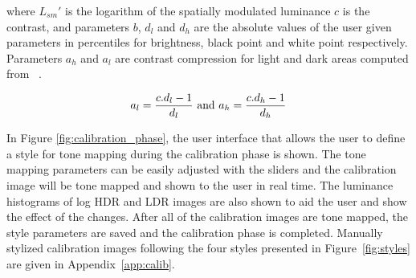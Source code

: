 where $L_{sm}'$ is the logarithm of the spatially modulated luminance $c$ is the contrast, and parameters $b$, $d_l$ and $d_h$ are the absolute values of the user given parameters in percentiles for brightness, black point and white point respectively. Parameters $a_h$ and $a_l$ are contrast compression for light and dark areas computed from ~\cite{mantiuk2008modeling}.

\begin{equation}
    a_l = {{c . d_l-1} \over {d_l}} \text{ and } a_h = {{c . d_h-1} \over {d_h}}
\end{equation}

In Figure \ref{fig:calibration_phase}, the user interface that allows the user to define a style for tone mapping during the calibration phase is shown. The tone mapping parameters can be easily adjusted with the sliders and the calibration image will be tone mapped and shown to the user in real time. The luminance histograms of log HDR and LDR images are also shown to aid the user and show the effect of the changes. After all of the calibration images are tone mapped, the style parameters are saved and the calibration phase is completed. Manually stylized calibration images following the four styles presented in Figure~\ref{fig:styles} are given in Appendix~\ref{app:calib}.


